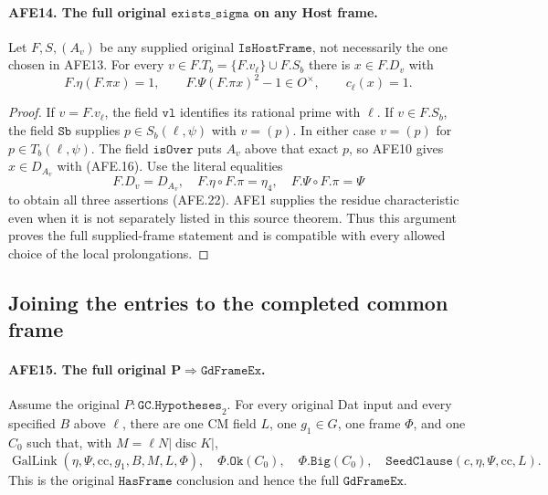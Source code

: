 \paragraph{AFE14. The full original \(\texttt{exists\_sigma}\) on any Host frame.}
\label{claim:AFE14}
Let \(F,S,(A_v)\) be any supplied original
\(\texttt{IsHostFrame}\), not necessarily the one
chosen in AFE13.
For every \(v\in F.T_b=\{F.v_\ell\}\cup F.S_b\)
there is \(x\in F.D_v\) with
\[
          F.\eta(F.\pi x)=1,\qquad
          F.\Psi(F.\pi x)^2-1\in O^\times,\qquad
                              c_\ell(x)=1.              \tag{AFE.22}
\]

\begin{proof}
If \(v=F.v_\ell\), the field \(\texttt{vl}\)
identifies its rational prime with \(\ell\).
If \(v\in F.S_b\), the field \(\texttt{Sb}\)
supplies \(p\in S_b(\ell,\psi)\) with \(v=(p)\).
In either case \(v=(p)\) for \(p\in T_b(\ell,\psi)\).
The field \(\texttt{isOver}\) puts \(A_v\) above
that exact \(p\), so AFE10 gives \(x\in D_{A_v}\)
with (AFE.16).
Use the literal equalities
\[
        F.D_v=D_{A_v},\quad
        F.\eta\circ F.\pi=\eta_4,\quad
        F.\Psi\circ F.\pi=\Psi
 \]
to obtain all three assertions (AFE.22).
AFE1 supplies the residue characteristic even when
it is not separately listed in this source theorem.
Thus this argument proves the full supplied-frame
statement and is compatible with every allowed choice
of the local prolongations.
\end{proof}

\subsection{Joining the entries to the completed common frame}

\paragraph{AFE15. The full original \(\boldsymbol{P\Rightarrow\texttt{GdFrameEx}}\).}
\label{claim:AFE15}
Assume the original \(P:\texttt{GC.Hypotheses}_{2}\).
For every original Dat input and every specified
\(B\) above \(\ell\), there are one CM field \(L\),
one \(g_1\in G\), one frame \(\Phi\), and one \(C_0\)
such that, with \(M=\ell N|\operatorname{disc}K|\),
\[
 \operatorname{GalLink}(\eta,\Psi,\mathrm{cc},g_1,B,M,L,\Phi),
 \quad \Phi.\texttt{Ok}(C_0),\quad \Phi.\texttt{Big}(C_0),
 \quad \texttt{SeedClause}(c,\eta,\Psi,\mathrm{cc},L).
                                                        \tag{AFE.23}
\]
This is the original \(\texttt{HasFrame}\) conclusion
and hence the full \(\texttt{GdFrameEx}\).

